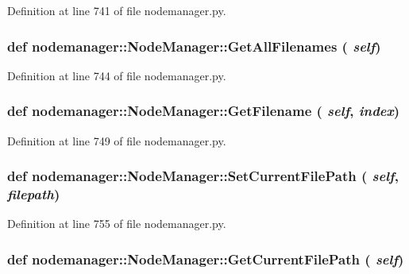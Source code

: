 Definition at line 741 of file nodemanager.py.\hypertarget{classnodemanager_1_1NodeManager_bf87dbbb8a5bbec59ab3b484853e1619}{
\subsubsection[GetAllFilenames]{\setlength{\rightskip}{0pt plus 5cm}def nodemanager::Node\-Manager::Get\-All\-Filenames ( {\em self})}}
\label{classnodemanager_1_1NodeManager_bf87dbbb8a5bbec59ab3b484853e1619}




Definition at line 744 of file nodemanager.py.\hypertarget{classnodemanager_1_1NodeManager_f96ff5a9ac497abf8918a7913c676da8}{
\subsubsection[GetFilename]{\setlength{\rightskip}{0pt plus 5cm}def nodemanager::Node\-Manager::Get\-Filename ( {\em self},  {\em index})}}
\label{classnodemanager_1_1NodeManager_f96ff5a9ac497abf8918a7913c676da8}




Definition at line 749 of file nodemanager.py.\hypertarget{classnodemanager_1_1NodeManager_e959c5f835af208968908fe5eeb140a6}{
\subsubsection[SetCurrentFilePath]{\setlength{\rightskip}{0pt plus 5cm}def nodemanager::Node\-Manager::Set\-Current\-File\-Path ( {\em self},  {\em filepath})}}
\label{classnodemanager_1_1NodeManager_e959c5f835af208968908fe5eeb140a6}




Definition at line 755 of file nodemanager.py.\hypertarget{classnodemanager_1_1NodeManager_4426800be5bb5a6d88f3d52e5c9758e8}{
\subsubsection[GetCurrentFilePath]{\setlength{\rightskip}{0pt plus 5cm}def nodemanager::Node\-Manager::Get\-Current\-File\-Path ( {\em self})}}
\label{classnodemanager_1_1NodeManager_4426800be5bb5a6d88f3d52e5c9758e8}




